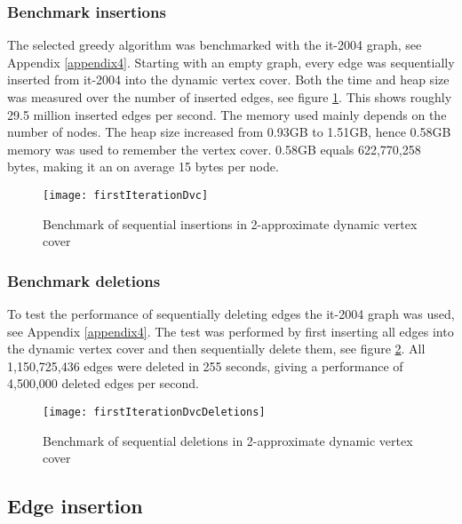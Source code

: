 \subsubsection{Benchmark insertions}
The selected greedy algorithm was benchmarked with the it-2004 graph, see Appendix \ref{appendix4}. Starting with an empty graph, every edge was sequentially inserted from it-2004 into the dynamic vertex cover. Both the time and heap size was measured over the number of inserted edges, see figure \ref{fig:firstIterationDvc}. This shows roughly 29.5 million inserted edges per second. The memory used mainly depends on the number of nodes. The heap size increased from 0.93GB to 1.51GB, hence 0.58GB memory was used to remember the vertex cover. 0.58GB equals 622,770,258 bytes, making it an on average 15 bytes per node. 


\begin{figure}[h]
\centering
\texttt{[image: firstIterationDvc]}    
\captionsetup{justification=centering}
\caption {Benchmark of sequential insertions in 2-approximate dynamic vertex cover}
\label{fig:firstIterationDvc}
\end{figure}

\subsubsection{Benchmark deletions}
To test the performance of sequentially deleting edges the it-2004 graph was used, see Appendix \ref{appendix4}. The test was performed by first inserting all edges into the dynamic vertex cover and then sequentially delete them, see figure \ref{fig:firstIterationDvcDeletion}. All 1,150,725,436 edges were deleted in 255 seconds, giving a performance of 4,500,000 deleted edges per second. 

\begin{figure}[h]
\centering
\texttt{[image: firstIterationDvcDeletions]}    
\captionsetup{justification=centering}
\caption {Benchmark of sequential deletions in 2-approximate dynamic vertex cover}
\label{fig:firstIterationDvcDeletion}
\end{figure}

\subsection{Edge insertion}

